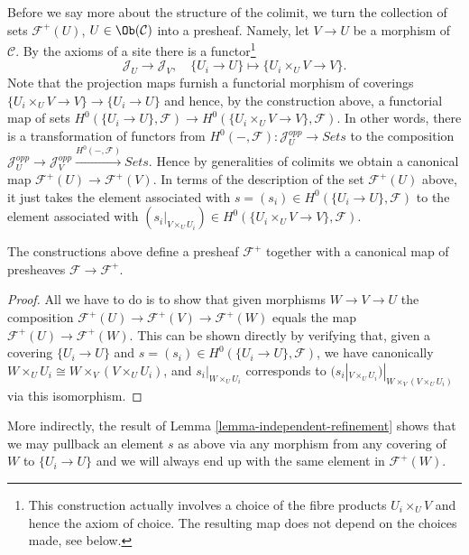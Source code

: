 \medskip\noindent
Before we say more about the structure of the colimit, we turn
the collection of sets
$\mathcal{F}^{+}(U)$, $U \in \Ob(\mathcal{C})$
into a presheaf. Namely, let $V \to U$ be a morphism of $\mathcal{C}$.
By the axioms of a site there is a functor\footnote{This construction
actually involves a choice of the fibre products $U_i \times_U V$
and hence the axiom of choice. The resulting map does not depend on
the choices made, see below.}
$$
\mathcal{J}_U
\longrightarrow
\mathcal{J}_V, \quad
\{U_i \to U\}
\longmapsto
\{U_i \times_U V \to V\}.
$$
Note that the projection maps furnish a functorial
morphism of coverings $\{U_i \times_U V \to V\} \to \{U_i \to U\}$
and hence, by the construction above, a functorial map of sets
$H^0(\{U_i \to U\}, \mathcal{F}) \to
H^0(\{U_i \times_U V \to V\}, \mathcal{F})$.
In other words, there is a transformation of functors
from $H^0(-, \mathcal{F}) : \mathcal{J}_U^{opp} \to \textit{Sets}$
to the composition
$\mathcal{J}_U^{opp} \to \mathcal{J}_V^{opp}
\xrightarrow{H^0(-, \mathcal{F})} \textit{Sets}$. Hence by
generalities of colimits we obtain a canonical map
$\mathcal{F}^+(U) \to \mathcal{F}^+(V)$. In terms of the description
of the set $\mathcal{F}^+(U)$ above, it just takes the element
associated with $s = (s_i) \in H^0(\{U_i \to U\}, \mathcal{F})$ to the
element associated with $(s_i|_{V \times_U U_i})
\in H^0(\{U_i \times_U V \to V\}, \mathcal{F})$.

\begin{lemma}
\label{lemma-plus-presheaf}
The constructions above define a presheaf
$\mathcal{F}^+$ together with a canonical
map of presheaves $\mathcal{F} \to \mathcal{F}^+$.
\end{lemma}

\begin{proof}
All we have to do is to show that given morphisms
$W \to V \to U$ the composition $\mathcal{F}^+(U)
\to \mathcal{F}^+(V) \to \mathcal{F}^+(W)$
equals the map $\mathcal{F}^+(U) \to \mathcal{F}^+(W)$.
This can be shown directly by verifying that, given
a covering $\{U_i \to U\}$ and
$s = (s_i) \in H^0(\{U_i \to U\}, \mathcal{F})$,
we have canonically
$W \times_U U_i \cong W \times_V (V \times_U U_i)$,
and
$s_i|_{W \times_U U_i}$
corresponds to
$(s_i|_{V \times_U U_i})|_{W \times_V (V \times_U U_i)}$
via this isomorphism.
\end{proof}

\noindent
More indirectly, the result of
Lemma \ref{lemma-independent-refinement} shows that
we may pullback an element $s$ as above via any morphism
from any covering of $W$ to $\{U_i \to U\}$
and we will always end up with the same element in
$\mathcal{F}^+(W)$.

